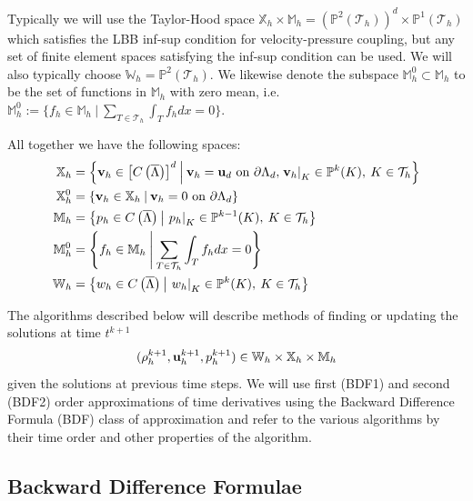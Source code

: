 \documentclass[letterpaper]{erdc}
\begin{document}
Typically we will use the Taylor-Hood space
$\mathbb{X}_h \times \mathbb{M}_h =
\left(\mathbb{P}^2\left(\mathcal{T}_h\right)\right)^d\times
\mathbb{P}^1\left(\mathcal{T}_h\right)$
which satisfies the LBB inf-sup condition for velocity-pressure coupling, but
any set of finite element spaces satisfying the inf-sup condition can be used.
We will also typically choose
$\mathbb{W}_h = \mathbb{P}^2\left(\mathcal{T}_h\right)$.  We likewise denote
the subspace $\mathbb{M}_h^0\subset \mathbb{M}_h$ to be the set of functions in
$\mathbb{M}_h$ with zero mean, i.e.
$\mathbb{M}_h^0 := \{ f_h\in \mathbb{M}_h \:|\:
\sum_{T\in\mathcal{T}_h}\int_{T}f_h dx = 0\}$.

All together we have the following spaces:
\begin{align*}  
	\mathbb{X}_h &= \left\{\textbf{v}_h\in \left[C\left(\overline{\Lambda}\right)\right]^d \:\middle|\: \textbf{v}_h = \textbf{u}_d \mbox{ on } \partial\Lambda_{d}, \left.\textbf{v}_h\right|_{K}\in\mathbb{P}^{k}(K), \:K\in\mathcal{T}_h  \right\} \\
  	\mathbb{X}^0_h &= \left\{\textbf{v}_h\in \mathbb{X}_h \:\middle|\: \textbf{v}_h = 0 \mbox{ on } \partial\Lambda_{d} \right\} \\
		\mathbb{M}_h &= \left\{p_h\in C\left(\overline{\Lambda}\right) \:\middle|\: \left.p_h\right|_{K}\in\mathbb{P}^{k-1}(K),\: K\in\mathcal{T}_h  \right\}\\
    \mathbb{M}_h^0 &= \left\{f_h\in \mathbb{M}_h \:\middle|\: \sum_{T\in\mathcal{T}_h}\int_{T}f_h dx = 0 \right\}\\
    \mathbb{W}_h &= \left\{w_h\in C\left(\overline{\Lambda}\right) \:\middle|\: \left.w_h\right|_{K}\in\mathbb{P}^{k}(K), \:K\in\mathcal{T}_h  \right\}
\end{align*} 

The algorithms described below will describe methods of finding or updating the
solutions at time $t^{k+1}$
\begin{equation}(\rho^{k+1}_h, \textbf{u}^{k+1}_{h}, p^{k+1}_h) \in
  \mathbb{W}_h\times\mathbb{X}_h\times \mathbb{M}_h \end{equation} given the
solutions at previous time steps.  We will use first (BDF1) and second (BDF2)
order approximations of time derivatives using the Backward Difference Formula
(BDF) class of approximation and refer to the various algorithms by their time
order and other properties of the algorithm.

%
%
\subsection{Backward Difference Formulae}
\end{document}
